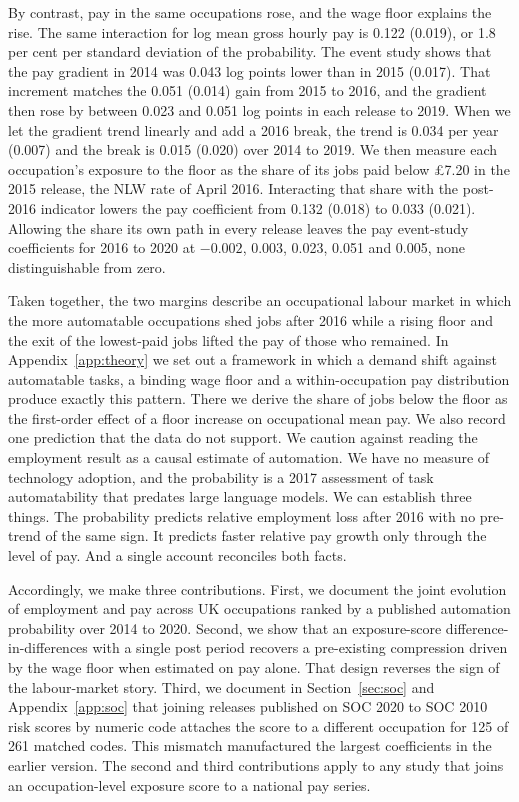 \documentclass[12pt,leqno]{article}
\begin{document}
By contrast, pay in the same occupations rose, and the wage floor explains the rise. The same interaction for log mean gross hourly pay is 0.122 (0.019), or 1.8 per cent per standard deviation of the probability. The event study shows that the pay gradient in 2014 was 0.043 log points lower than in 2015 (0.017). That increment matches the 0.051 (0.014) gain from 2015 to 2016, and the gradient then rose by between 0.023 and 0.051 log points in each release to 2019. When we let the gradient trend linearly and add a 2016 break, the trend is 0.034 per year (0.007) and the break is 0.015 (0.020) over 2014 to 2019. We then measure each occupation's exposure to the floor as the share of its jobs paid below \pounds 7.20 in the 2015 release, the NLW rate of April 2016. Interacting that share with the post-2016 indicator lowers the pay coefficient from 0.132 (0.018) to 0.033 (0.021). Allowing the share its own path in every release leaves the pay event-study coefficients for 2016 to 2020 at $-0.002$, 0.003, 0.023, 0.051 and 0.005, none distinguishable from zero.

Taken together, the two margins describe an occupational labour market in which the more automatable occupations shed jobs after 2016 while a rising floor and the exit of the lowest-paid jobs lifted the pay of those who remained. In Appendix~\ref{app:theory} we set out a framework in which a demand shift against automatable tasks, a binding wage floor and a within-occupation pay distribution produce exactly this pattern. There we derive the share of jobs below the floor as the first-order effect of a floor increase on occupational mean pay. We also record one prediction that the data do not support. We caution against reading the employment result as a causal estimate of automation. We have no measure of technology adoption, and the probability is a 2017 assessment of task automatability that predates large language models. We can establish three things. The probability predicts relative employment loss after 2016 with no pre-trend of the same sign. It predicts faster relative pay growth only through the level of pay. And a single account reconciles both facts.

Accordingly, we make three contributions. First, we document the joint evolution of employment and pay across UK occupations ranked by a published automation probability over 2014 to 2020. Second, we show that an exposure-score difference-in-differences with a single post period recovers a pre-existing compression driven by the wage floor when estimated on pay alone. That design reverses the sign of the labour-market story. Third, we document in Section~\ref{sec:soc} and Appendix~\ref{app:soc} that joining releases published on SOC 2020 to SOC 2010 risk scores by numeric code attaches the score to a different occupation for 125 of 261 matched codes. This mismatch manufactured the largest coefficients in the earlier version. The second and third contributions apply to any study that joins an occupation-level exposure score to a national pay series.
\end{document}
